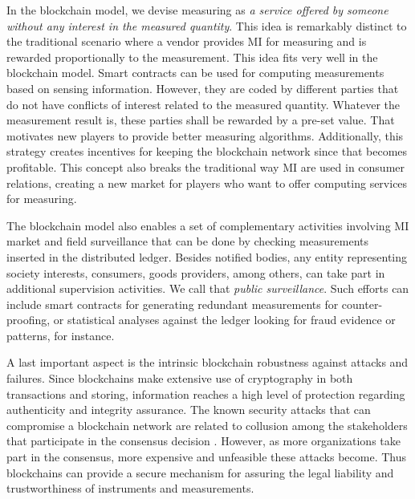 \documentclass[journal]{IEEEtran}
\begin{document}
In the blockchain model, we devise measuring as \emph{a service offered by someone without any interest in the measured quantity}. 
This idea is remarkably distinct to the traditional scenario where a vendor provides MI for measuring and is rewarded proportionally to the measurement. 
This idea fits very well in the blockchain model. 
Smart contracts can be used for computing measurements based on sensing information. 
However, they are coded by different parties that do not have conflicts of interest related to the measured quantity.
Whatever the measurement result is, these parties shall be rewarded by a pre-set value. 
That motivates new players to provide better measuring algorithms.
Additionally, this strategy creates incentives for keeping the blockchain network since that becomes profitable. 
This concept also breaks the traditional way MI are used in consumer relations, creating a new market for players who want to offer computing services for measuring. 

The blockchain model also enables a set of complementary activities involving MI market and field surveillance that can be done by checking measurements inserted in the distributed ledger.
Besides notified bodies, any entity representing society interests, consumers, goods providers, among others, can take part in additional supervision activities.
We call that \emph{public surveillance}.
Such efforts can include smart contracts for generating redundant measurements for counter-proofing, or statistical analyses against the ledger looking for fraud evidence or patterns, for instance.

A last important aspect is the intrinsic blockchain robustness against attacks and failures.
Since blockchains make extensive use of cryptography in both transactions and storing, information reaches a high level of protection regarding authenticity and integrity assurance.
The known security attacks that can compromise a blockchain network are related to collusion among the stakeholders that participate in the consensus decision \cite{karame2016bitcoin}.
However, as more organizations take part in the consensus, more expensive and unfeasible these attacks become.
Thus blockchains can provide a secure mechanism for assuring the legal liability and trustworthiness of instruments and measurements.

\end{document}
